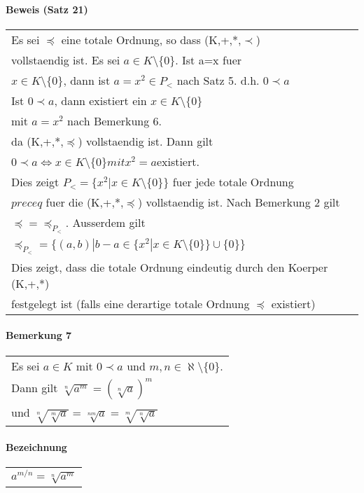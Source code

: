 \documentclass{scrartcl}
\begin{document}
\paragraph{Beweis (Satz 21)}
\begin{tabbing}
\begin{tabular}{l}
Es sei $\preceq$ eine totale Ordnung, so dass (K,+,*,$\prec$)\\
vollstaendig ist. Es sei $a\in K\setminus \{ 0\}$. Ist a=x fuer\\
$x\in K\setminus \{ 0\}$, dann ist $a=x^2 \in P_<$ nach Satz 5. d.h. $0\prec a$\\
Ist $0 \prec a$, dann existiert ein $x\in K\setminus \{ 0\}$ \\
mit $a=x^2$ nach Bemerkung 6.\\
da (K,+,*,$\preceq$) vollstaendig ist. Dann gilt \\
$0 \prec a \Leftrightarrow x \in K \setminus \{ 0\} mit x^2=a $existiert.\\
Dies zeigt $P_< = \{ x^2|x\in K\setminus \{ 0\} \}$ fuer jede totale Ordnung\\
$preceq$ fuer die (K,+,*,$\preceq$) vollstaendig ist. Nach Bemerkung 2 gilt\\
$ \preceq = \preceq_{P_<} $. Ausserdem gilt \\
$\preceq_{P_<} = \{ (a,b)|b-a \in \{ x^2|x \in K\setminus \{ 0\} \}\cup \{ 0\} \}$\\
Dies zeigt, dass die totale Ordnung eindeutig durch den Koerper (K,+,*)\\
festgelegt ist (falls eine derartige totale Ordnung $\preceq$ existiert)
\end{tabular}
\end{tabbing}

\paragraph{Bemerkung 7}
\begin{tabbing}
\begin{tabular}{l}
Es sei $a\in K$ mit $0 \prec a$ und $m,n\in \aleph \setminus \{ 0\}$.\\
Dann gilt $\sqrt[n]{a^m} = (\sqrt[n]{a})^m$\\
und $\sqrt[n]{\sqrt[m]{a}}=\sqrt[nm]{a}=\sqrt[m]{\sqrt[n]{a}}$
\end{tabular}
\end{tabbing}

\paragraph{Bezeichnung}
\begin{tabbing}
\begin{tabular}{l}
$a^{m/n} = \sqrt[n]{a^m}$
\end{tabular}
\end{tabbing}
\end{document}
